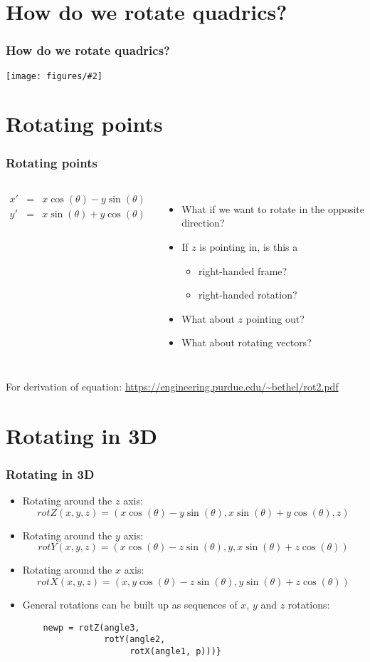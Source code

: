 \documentclass[slidestop,xcolor=pst]{beamer}
\newcommand{\mygraphc}[2]{\centerline{\texttt{[image: figures/\#2]}}}
\newcommand{\sect}[1]{
\section{#1}
\begin{frame}[fragile]\frametitle{#1}
}
\newcommand{\bi}{\begin{itemize}}
\newcommand{\ei}{\end{itemize}}
\begin{document}
\sect{How do we rotate quadrics?}
\mygraphc{0.7}{rotatedellipsoids.png}
\end{frame}

\sect{Rotating points}
\begin{columns}
  \begin{eqnarray*}
    x' &=& x\cos(\theta) - y\sin(\theta)\\
    y' &=& x\sin(\theta) + y\cos(\theta)
  \end{eqnarray*}
  \pause
  \begin{itemize}
    \item What if we want to rotate in the opposite direction? \pause
  \item If $z$ is pointing in, is this a
    \begin{itemize}
    \item right-handed frame?
    \item right-handed rotation?
    \end{itemize}
    \pause
  \item What about $z$ pointing out?
    \pause
  \item What about rotating vectors?
    \pause
  \end{itemize}
\end{columns}

\vfill
For derivation of equation:
\url{https://engineering.purdue.edu/~bethel/rot2.pdf}

\end{frame}

\sect{Rotating in 3D}
\bi
\item Rotating around the $z$ axis:
  \[
  rotZ(x,y,z) = (x\cos(\theta) - y\sin(\theta), x\sin(\theta) + y\cos(\theta), z)
  \]
\item Rotating around the $y$ axis:
  \[
  rotY(x,y,z) = (x\cos(\theta) - z\sin(\theta), y, x\sin(\theta) + z\cos(\theta))
  \]
\item Rotating around the $x$ axis:
  \[
  rotX(x,y,z) = (x, y\cos(\theta) - z\sin(\theta), y\sin(\theta) + z\cos(\theta))
  \]
\item General rotations can be built up as sequences of $x$, $y$ and
  $z$ rotations:
  \begin{verbatim}
    newp = rotZ(angle3,
                rotY(angle2,
                     rotX(angle1, p)))}
\end{verbatim}
  \ei
\end{frame}
\end{document}
